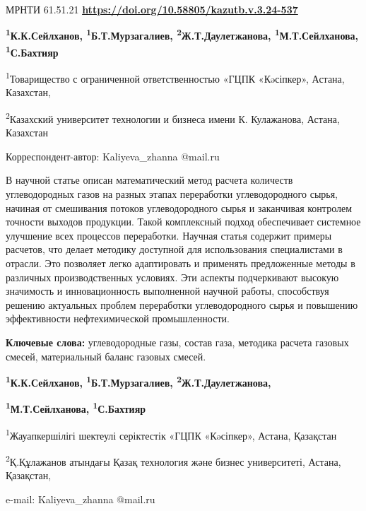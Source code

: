 \newpage
МРНТИ 61.51.21
\hfill {\bfseries \href{https://doi.org/10.58805/kazutb.v.3.24-537}{https://doi.org/10.58805/kazutb.v.3.24-537}}


\begin{center}
{\bfseries \textsuperscript{1}К.К.Сейлханов,
\textsuperscript{1}Б.Т.Мурзагалиев,
\textsuperscript{2}Ж.Т.Даулетжанова\envelope, \textsuperscript{1}М.Т.Сейлханова, \textsuperscript{1}С.Бахтияр}

\textsuperscript{1}Товарищество с ограниченной ответственностью «ГЦПК
«Кəсіпкер», Астана, Казахстан,

\textsuperscript{2}Казахский университет технологии и бизнеса имени К.
Кулажанова, Астана, Казахстан
\end{center}
\envelope Корреспондент-автор: Kaliyeva\_zhanna
@mail.ru


В научной статье описан математический метод расчета количеств
углеводородных газов на разных этапах переработки углеводородного сырья,
начиная от смешивания потоков углеводородного сырья и заканчивая
контролем точности выходов продукции. Такой комплексный подход
обеспечивает системное улучшение всех процессов переработки. Научная
статья содержит примеры расчетов, что делает методику доступной для
использования специалистами в отрасли. Это позволяет легко адаптировать
и применять предложенные методы в различных производственных условиях.
Эти аспекты подчеркивают высокую значимость и инновационность
выполненной научной работы, способствуя решению актуальных проблем
переработки углеводородного сырья и повышению эффективности
нефтехимической промышленности.

{\bfseries Ключевые слова:} углеводородные газы, состав газа, методика
расчета газовых смесей, материальный баланс газовых смесей.


\begin{center}
{\bfseries \textsuperscript{1}К.К.Сейлханов,
\textsuperscript{1}Б.Т.Мурзагалиев,
\textsuperscript{2}Ж.Т.Даулетжанова\envelope,}

{\bfseries \textsuperscript{1}М.Т.Сейлханова, \textsuperscript{1}С.Бахтияр}

\textsuperscript{1}Жауапкершілігі шектеулі серіктестік «ГЦПК «Кəсіпкер»,
Астана, Қазақстан

\textsuperscript{2}Қ.Құлажанов атындағы Қазақ технология және бизнес
университеті, Астана, Қазақстан,

e-mail: Kaliyeva\_zhanna @mail.ru
\end{center}

